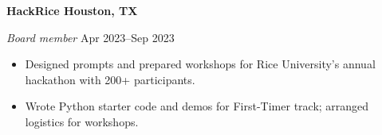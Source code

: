 \textbf{HackRice \hfill Houston, TX}\par
\textit{Board member} \hfill Apr 2023--Sep 2023

\begin{itemize}
	\item Designed prompts and prepared workshops for Rice University's annual hackathon with 200+ participants.
	\item Wrote Python starter code and demos for First-Timer track; arranged logistics for workshops.
\end{itemize}\par